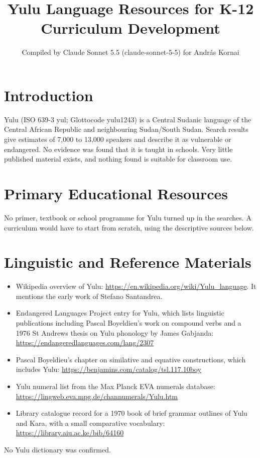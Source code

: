 \documentclass[12pt]{article}
\title{Yulu Language Resources for K-12 Curriculum Development}
\author{Compiled by Claude Sonnet 5.5 (claude-sonnet-5-5) for Andr\'as Kornai}
\date{}
\begin{document}
\maketitle

\section{Introduction}
Yulu (ISO 639-3 yul; Glottocode yulu1243) is a Central Sudanic language of the Central African Republic and neighbouring Sudan/South Sudan. Search results give estimates of 7,000 to 13,000 speakers and describe it as vulnerable or endangered. No evidence was found that it is taught in schools. Very little published material exists, and nothing found is suitable for classroom use.

\section{Primary Educational Resources}
No primer, textbook or school programme for Yulu turned up in the searches. A curriculum would have to start from scratch, using the descriptive sources below.

\section{Linguistic and Reference Materials}
\begin{itemize}
\item Wikipedia overview of Yulu: \url{https://en.wikipedia.org/wiki/Yulu_language}. It mentions the early work of Stefano Santandrea.
\item Endangered Languages Project entry for Yulu, which lists linguistic publications including Pascal Boyeldieu's work on compound verbs and a 1976 St Andrews thesis on Yulu phonology by James Gabjanda: \url{https://endangeredlanguages.com/lang/2307}
\item Pascal Boyeldieu's chapter on similative and equative constructions, which includes Yulu: \url{https://benjamins.com/catalog/tsl.117.10boy}
\item Yulu numeral list from the Max Planck EVA numerals database: \url{https://lingweb.eva.mpg.de/channumerals/Yulu.htm}
\item Library catalogue record for a 1970 book of brief grammar outlines of Yulu and Kara, with a small comparative vocabulary: \url{https://library.aiu.ac.ke/bib/64160}
\end{itemize}
No Yulu dictionary was confirmed.
\end{document}
